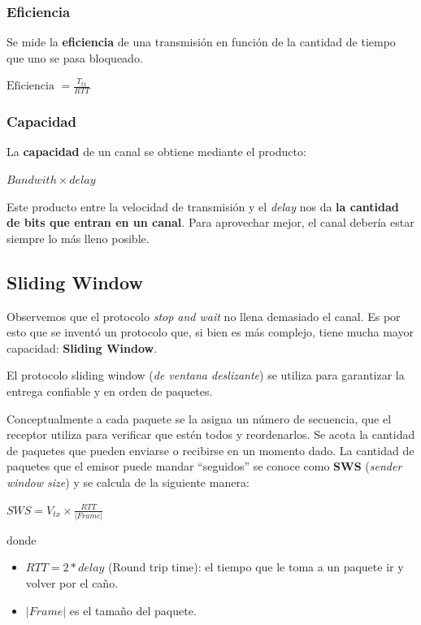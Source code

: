 \documentclass[]{article}
\begin{document}


\subsubsection{Eficiencia}
Se mide la \textbf{eficiencia} de una transmisión en función de la cantidad de tiempo que uno se pasa bloqueado.
\begin{center}
    $\displaystyle \text{Eficiencia }= \frac{T_{tx}}{RTT}$ %
\end{center}

\subsubsection{Capacidad}
La \textbf{capacidad} de un canal se obtiene mediante el producto:
\begin{center}
    $\displaystyle Bandwith \times delay$
\end{center}

Este producto entre la velocidad de transmisión y el \emph{delay} nos da \textbf{la cantidad de bits que entran en un canal}. Para aprovechar mejor, el canal debería estar siempre lo más lleno posible.


\subsection{Sliding Window}
Observemos que el protocolo \emph{stop and wait} no llena demasiado el canal. Es por esto que se inventó un protocolo que, si bien es más complejo, tiene mucha mayor capacidad: \textbf{Sliding Window}.



El protocolo sliding window (\emph{de ventana deslizante}) se utiliza para garantizar la entrega confiable y en orden de paquetes.

Conceptualmente a cada paquete se la asigna un número de secuencia, que el receptor utiliza para verificar que estén todos y reordenarlos. Se acota la cantidad de paquetes que pueden enviarse o recibirse en un momento dado. La cantidad de paquetes que el emisor puede mandar ``seguidos'' se conoce como \textbf{SWS} (\emph{sender window size}) y se calcula de la siguiente manera:

\begin{center}
    $SWS = V_{tx}\times \displaystyle \frac{RTT}{|Frame|}$
\end{center}

donde
\begin{itemize}
    \item $RTT = 2*delay$ (Round trip time): el tiempo que le toma a un paquete ir y volver por el caño.
    \item $|Frame|$ es el tamaño del paquete.
\end{itemize}
\end{document}
